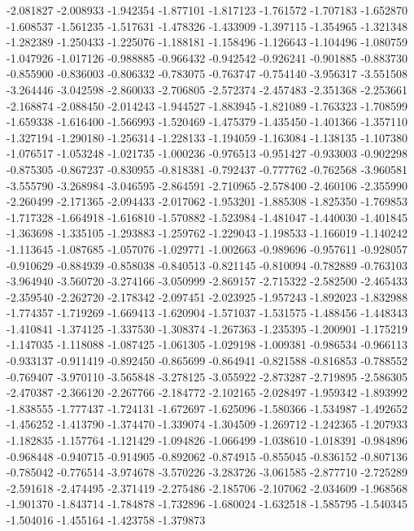 -2.081827
-2.008933
-1.942354
-1.877101
-1.817123
-1.761572
-1.707183
-1.652870
-1.608537
-1.561235
-1.517631
-1.478326
-1.433909
-1.397115
-1.354965
-1.321348
-1.282389
-1.250433
-1.225076
-1.188181
-1.158496
-1.126643
-1.104496
-1.080759
-1.047926
-1.017126
-0.988885
-0.966432
-0.942542
-0.926241
-0.901885
-0.883730
-0.855900
-0.836003
-0.806332
-0.783075
-0.763747
-0.754140
-3.956317
-3.551508
-3.264446
-3.042598
-2.860033
-2.706805
-2.572374
-2.457483
-2.351368
-2.253661
-2.168874
-2.088450
-2.014243
-1.944527
-1.883945
-1.821089
-1.763323
-1.708599
-1.659338
-1.616400
-1.566993
-1.520469
-1.475379
-1.435450
-1.401366
-1.357110
-1.327194
-1.290180
-1.256314
-1.228133
-1.194059
-1.163084
-1.138135
-1.107380
-1.076517
-1.053248
-1.021735
-1.000236
-0.976513
-0.951427
-0.933003
-0.902298
-0.875305
-0.867237
-0.830955
-0.818381
-0.792437
-0.777762
-0.762568
-3.960581
-3.555790
-3.268984
-3.046595
-2.864591
-2.710965
-2.578400
-2.460106
-2.355990
-2.260499
-2.171365
-2.094433
-2.017062
-1.953201
-1.885308
-1.825350
-1.769853
-1.717328
-1.664918
-1.616810
-1.570882
-1.523984
-1.481047
-1.440030
-1.401845
-1.363698
-1.335105
-1.293883
-1.259762
-1.229043
-1.198533
-1.166019
-1.140242
-1.113645
-1.087685
-1.057076
-1.029771
-1.002663
-0.989696
-0.957611
-0.928057
-0.910629
-0.884939
-0.858038
-0.840513
-0.821145
-0.810094
-0.782889
-0.763103
-3.964940
-3.560720
-3.274166
-3.050999
-2.869157
-2.715322
-2.582500
-2.465433
-2.359540
-2.262720
-2.178342
-2.097451
-2.023925
-1.957243
-1.892023
-1.832988
-1.774357
-1.719269
-1.669413
-1.620904
-1.571037
-1.531575
-1.488456
-1.448343
-1.410841
-1.374125
-1.337530
-1.308374
-1.267363
-1.235395
-1.200901
-1.175219
-1.147035
-1.118088
-1.087425
-1.061305
-1.029198
-1.009381
-0.986534
-0.966113
-0.933137
-0.911419
-0.892450
-0.865699
-0.864941
-0.821588
-0.816853
-0.788552
-0.769407
-3.970110
-3.565848
-3.278125
-3.055922
-2.873287
-2.719895
-2.586305
-2.470387
-2.366120
-2.267766
-2.184772
-2.102165
-2.028497
-1.959342
-1.893992
-1.838555
-1.777437
-1.724131
-1.672697
-1.625096
-1.580366
-1.534987
-1.492652
-1.456252
-1.413790
-1.374470
-1.339074
-1.304509
-1.269712
-1.242365
-1.207933
-1.182835
-1.157764
-1.121429
-1.094826
-1.066499
-1.038610
-1.018391
-0.984896
-0.968448
-0.940715
-0.914905
-0.892062
-0.874915
-0.855045
-0.836152
-0.807136
-0.785042
-0.776514
-3.974678
-3.570226
-3.283726
-3.061585
-2.877710
-2.725289
-2.591618
-2.474495
-2.371419
-2.275486
-2.185706
-2.107062
-2.034609
-1.968568
-1.901370
-1.843714
-1.784878
-1.732896
-1.680024
-1.632518
-1.585795
-1.540345
-1.504016
-1.455164
-1.423758
-1.379873
